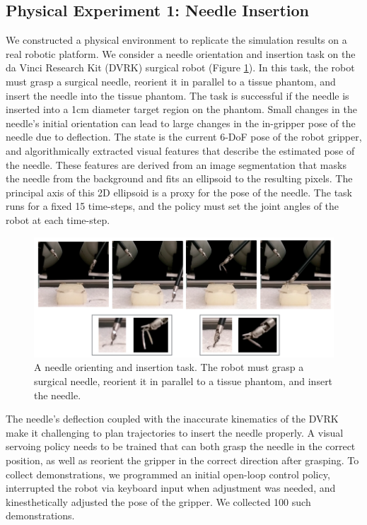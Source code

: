 \subsection*{Physical Experiment 1: Needle Insertion}
We constructed a physical environment to replicate the simulation results on a real robotic platform.
We consider a needle orientation and insertion task on the da Vinci Research Kit (DVRK) surgical robot (Figure \ref{fig:dvrkexp3}). In this task, the robot must grasp a surgical needle, reorient it in parallel to a tissue phantom, and insert the needle into the tissue phantom.
The task is successful if the needle is inserted into a 1cm diameter target region on the phantom. Small changes in the needle's initial orientation can lead to large changes in the in-gripper pose of the needle due to deflection. 
The state is the current 6-DoF pose of the robot gripper, and algorithmically extracted visual features that describe the estimated pose of the needle.
These features are derived from an image segmentation that masks the needle from the background and fits an ellipsoid to the resulting pixels. 
The principal axis of this 2D ellipsoid is a proxy for the pose of the needle.
The task runs for a fixed 15 time-steps, and the policy must set the joint angles of the robot at each time-step.


\begin{figure}[ht!]
    \centering
    \includegraphics[width=\textwidth]{ddco-experiments/exp3.png}
    \caption{A needle orienting and insertion task. The robot must grasp a surgical needle, reorient it in parallel to a tissue phantom, and insert the needle.   \label{fig:dvrkexp3}}
\end{figure}

The needle's deflection coupled with the inaccurate kinematics of the DVRK make it challenging to plan trajectories to insert the needle properly.
A visual servoing policy needs to be trained that can both grasp the needle in the correct position, as well as reorient the gripper in the correct direction after grasping.
To collect demonstrations, we programmed an initial open-loop control policy, interrupted the robot via keyboard input when adjustment was needed, and kinesthetically adjusted the pose of the gripper. 
We collected 100 such demonstrations.

